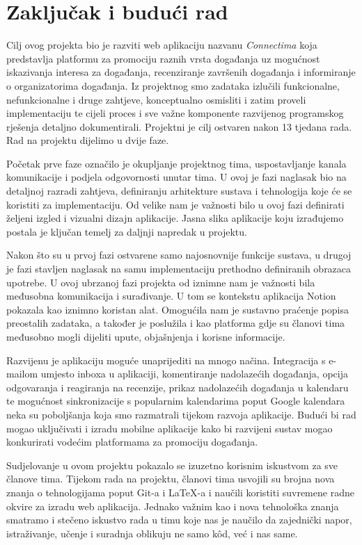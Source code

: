 \chapter{Zaključak i budući rad}
		
		Cilj ovog projekta bio je razviti web aplikaciju nazvanu \textit{Connectima} koja predstavlja platformu za promociju raznih vrsta događanja uz mogućnost iskazivanja interesa za događanja, recenziranje završenih događanja i informiranje o organizatorima događanja. Iz projektnog smo zadataka izlučili 
		funkcionalne, nefunkcionalne i druge zahtjeve, konceptualno osmisliti i zatim proveli implementaciju te cijeli proces i sve važne komponente razvijenog programskog rješenja detaljno dokumentirali. Projektni je cilj ostvaren nakon 13 tjedana rada. Rad na projektu dijelimo u dvije faze. 
		
		Početak prve faze označilo je okupljanje projektnog tima, uspostavljanje kanala komunikacije i podjela odgovornosti unutar tima. U ovoj je fazi naglasak bio na detaljnoj razradi zahtjeva,  definiranju arhitekture sustava i tehnologija koje će se koristiti za implementaciju. Od velike nam je važnosti bilo u ovoj fazi definirati željeni izgled i vizualni dizajn aplikacije. Jasna slika aplikacije koju izrađujemo postala je ključan temelj za daljnji napredak u projektu.
		
		Nakon što su u prvoj fazi ostvarene samo najosnovnije funkcije sustava, u drugoj je fazi stavljen naglasak na samu implementaciju prethodno definiranih obrazaca upotrebe. U ovoj ubrzanoj fazi projekta od iznimne nam je važnosti bila međusobna komunikacija i surađivanje. U tom se kontekstu aplikacija Notion pokazala kao iznimno koristan alat. Omogućila nam je sustavno praćenje popisa preostalih zadataka, a također je poslužila i kao platforma gdje su članovi tima međusobno mogli dijeliti upute, objašnjenja i korisne informacije.
		
		Razvijenu je aplikaciju moguće unaprijediti na mnogo načina. Integracija s e-mailom umjesto inboxa u aplikaciji, komentiranje nadolazećih događanja, opcija odgovaranja i reagiranja na recenzije, prikaz nadolazećih događanja u kalendaru te mogućnost sinkronizacije s popularnim kalendarima poput Google kalendara neka su poboljšanja koja smo razmatrali tijekom razvoja aplikacije. Budući bi rad mogao uključivati i izradu mobilne aplikacije kako bi razvijeni sustav mogao konkurirati vodećim platformama za promociju događanja. 
		
		Sudjelovanje u ovom projektu pokazalo se izuzetno korisnim iskustvom za sve članove tima. Tijekom rada na projektu, članovi tima usvojili su brojna nova znanja o tehnologijama poput Git-a i LaTeX-a i naučili koristiti suvremene radne okvire za izradu web aplikacija. Jednako važnim kao i nova tehnološka znanja smatramo i stečeno iskustvo rada u timu koje nas je naučilo da zajednički napor, istraživanje, učenje i suradnja oblikuju ne samo kôd, već i nas same. 
		
		\eject 
